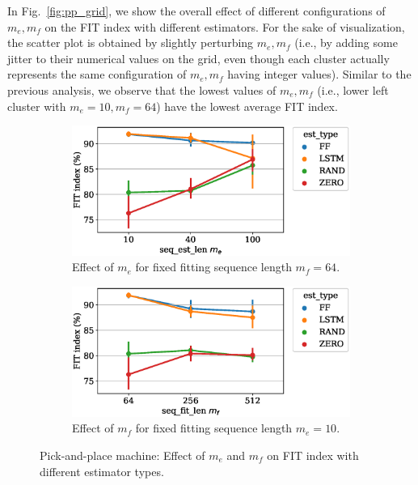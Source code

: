 \documentclass{article}
\newcommand{\seqlen}{m}
\begin{document}
In Fig.~\ref{fig:pp_grid}, we show the overall effect of different configurations of $\seqlen_e, \seqlen_f$ on the FIT index with different estimators. For the sake of visualization, the scatter plot is obtained by slightly perturbing $\seqlen_e, \seqlen_f$ (i.e., by adding some jitter to their numerical values on the grid, even though each cluster actually represents the same  configuration of $\seqlen_e, \seqlen_f$ having integer values). Similar to the previous analysis,  we observe that the lowest values of $\seqlen_e, \seqlen_f$ (i.e., lower left cluster with $\seqlen_e = 10, \seqlen_f = 64$) have the lowest average FIT index.  

\begin{figure}
	\centering
\begin{subfigure}[b]{.6\columnwidth}
	\includegraphics[width=\columnwidth]{figures/PP_short_fit_seq_vs_est_seq.eps}
	\caption{Effect of $m_e$ for fixed fitting sequence length $m_f =64$.}
	\label{fig:fit_seq}
\end{subfigure}
\begin{subfigure}[b]{.6\columnwidth}
	\includegraphics[width=\columnwidth]{figures/PP_short_est_seq_vs_fit_seq.eps}
	\caption{Effect of $m_f$ for fixed fitting sequence length $m_e =10$.}
	\label{fig:est_seq}
\end{subfigure}
\caption{Pick-and-place machine: Effect of $m_e$ and $m_f$ on FIT index with different estimator types.}
\label{fig:pp_fit_est_seq}
\end{figure}
\end{document}
